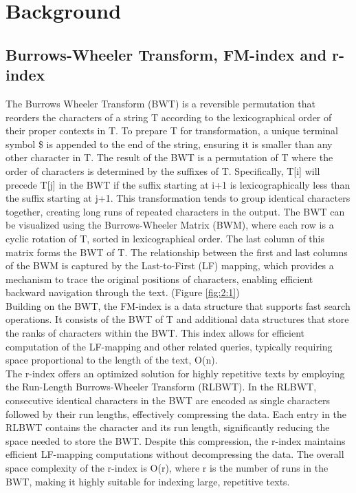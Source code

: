 \documentclass[11pt]{ucthesis}
\begin{document}
\section{Background}

\subsection{Burrows-Wheeler Transform, FM-index and r-index}
The Burrows Wheeler Transform (BWT) \cite{burrows1994block} is a reversible permutation that reorders the characters of a string T according to the lexicographical order of their proper contexts in T. To prepare T for transformation, a unique terminal symbol \$ is appended to the end of the string, ensuring it is smaller than any other character in T. The result of the BWT is a permutation of T where the order of characters is determined by the suffixes of T. Specifically, T[i] will precede T[j] in the BWT if the suffix starting at i+1 is lexicographically less than the suffix starting at j+1. This transformation tends to group identical characters together, creating long runs of repeated characters in the output.
The BWT can be visualized using the Burrows-Wheeler Matrix (BWM), where each row is a cyclic rotation of T, sorted in lexicographical order. The last column of this matrix forms the BWT of T. The relationship between the first and last columns of the BWM is captured by the Last-to-First (LF) mapping, which provides a mechanism to trace the original positions of characters, enabling efficient backward navigation through the text. (Figure \ref{fig:2:1})\\
Building on the BWT, the FM-index is a data structure that supports fast search operations. It consists of the BWT of T and additional data structures that store the ranks of characters within the BWT. This index allows for efficient computation of the LF-mapping and other related queries, typically requiring space proportional to the length of the text, O(n).\\
The r-index offers an optimized solution for highly repetitive texts by employing the Run-Length Burrows-Wheeler Transform (RLBWT). In the RLBWT, consecutive identical characters in the BWT are encoded as single characters followed by their run lengths, effectively compressing the data. Each entry in the RLBWT contains the character and its run length, significantly reducing the space needed to store the BWT. Despite this compression, the r-index \cite{gagie2020fully} maintains efficient LF-mapping computations without decompressing the data. The overall space complexity of the r-index is O(r), where r is the number of runs in the BWT, making it highly suitable for indexing large, repetitive texts. 
\end{document}
